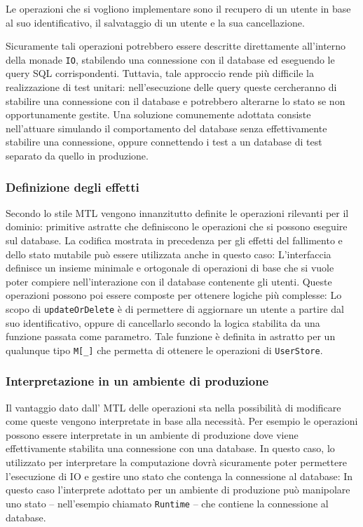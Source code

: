 Le operazioni che si vogliono implementare sono il recupero di un utente in base al suo identificativo, il salvataggio di un utente e la sua cancellazione.

Sicuramente tali operazioni potrebbero essere descritte direttamente all'interno della monade \lstinline{IO}, stabilendo una connessione con il database ed eseguendo le query SQL corrispondenti. Tuttavia, tale approccio rende più difficile la realizzazione di test unitari: nell'esecuzione delle query queste cercheranno di stabilire una connessione con il database e potrebbero alterarne lo stato se non opportunamente gestite. Una soluzione comunemente adottata consiste nell'attuare  simulando il comportamento del database senza effettivamente stabilire una connessione, oppure connettendo i test a un database di test separato da quello in produzione.

\subsubsection{Definizione degli effetti}
Secondo lo stile MTL vengono innanzitutto definite le operazioni rilevanti per il dominio: primitive astratte che definiscono le operazioni che si possono eseguire sul database. La codifica mostrata in precedenza per gli effetti del fallimento e dello stato mutabile può essere utilizzata anche in questo caso:
L'interfaccia definisce un insieme minimale e ortogonale di operazioni di base che si vuole poter compiere nell'interazione con il database contenente gli utenti. Queste operazioni possono poi essere composte per ottenere logiche più complesse:
Lo scopo di \lstinline{updateOrDelete} è di permettere di aggiornare un utente a partire dal suo identificativo, oppure di cancellarlo secondo la logica stabilita da una funzione passata come parametro.
Tale funzione è definita in astratto per un qualunque tipo \lstinline{M[_]} che permetta di ottenere le operazioni di \lstinline{UserStore}.

\subsubsection{Interpretazione in un ambiente di produzione}
Il vantaggio dato dall' MTL delle operazioni sta nella possibilità di modificare come queste vengono interpretate in base alla necessità.
Per esempio le operazioni possono essere interpretate in un ambiente di produzione dove viene effettivamente stabilita una connessione con una database. In questo caso, lo  utilizzato per interpretare la computazione dovrà sicuramente poter permettere l'esecuzione di IO e gestire uno stato che contenga la connessione al database:
In questo caso l'interprete adottato per un ambiente di produzione può manipolare uno stato -- nell'esempio chiamato \lstinline{Runtime} -- che contiene la connessione al database.

